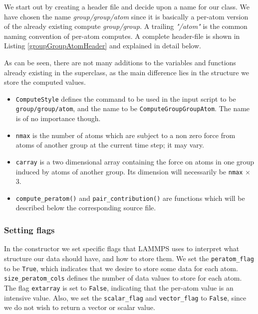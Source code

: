 \documentclass[twoside,english]{uiofysmaster}
\begin{document}
We start out by creating a header file and decide upon a name for our class. 
We have chosen the name \textit{group/group/atom} since it is basically a per-atom version of the already existing compute \textit{group/group}. 
A trailing {\it "/atom"} is the common naming convention of per-atom computes. 
A complete header-file is shown in Listing \ref{groupGroupAtomHeader} and explained in detail below.


As can be seen, there are not many additions to the variables and functions already existing in the superclass, as the main difference lies in the structure we store the computed values.

\begin{itemize}
\item \texttt{ComputeStyle} defines the command to be used in the input script to be \linebreak[1] \texttt{group/group/atom}, and the name to be \texttt{ComputeGroupGroupAtom}. 
	The name is of no importance though. 
\item \texttt{nmax} is the number of atoms which are subject to a non zero force from atoms of another group at the current time step; it may vary.

\item \texttt{carray} is a two dimensional array containing the force on atoms in one group induced by atoms of another group. Its dimension will necessarily be \texttt{nmax} $\times$ 3.

\item \texttt{compute\_peratom()} and \texttt{pair\_contribution()} are functions which will be described below the corresponding source file. 
\end{itemize}




\subsubsection{Setting flags}
In the constructor we set specific flags that LAMMPS uses to interpret what structure our data should have, and how to store them. 
We set the \texttt{peratom\_flag} to be \texttt{True}, which indicates that we desire to store some data for each atom. 
\texttt{size\_peratom\_cols} defines the number of data values to store for each atom. 
The flag \texttt{extarray} is set to \texttt{False}, indicating that the per-atom value is an intensive value. 
Also, we set the \texttt{scalar\_flag} and \texttt{vector\_flag} to \texttt{False}, since we do not wish to return a vector or scalar value.
\end{document}
